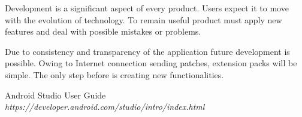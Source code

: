 \documentclass[12pt]{article}
\begin{document}
Development is a significant aspect of every product.
Users expect it to move with the evolution of technology.
To remain useful product must apply new features and deal with possible mistakes or problems.

Due to consistency and transparency of the application future development is possible.
Owing to Internet connection sending patches, extension packs will be simple.
The only step before is creating new functionalities.

\newpage
\listoffigures

\newpage
\begin{thebibliography}{9}
Android Studio User Guide
\textit {https://developer.android.com/studio/intro/index.html}

\end{thebibliography}
\end{document}
